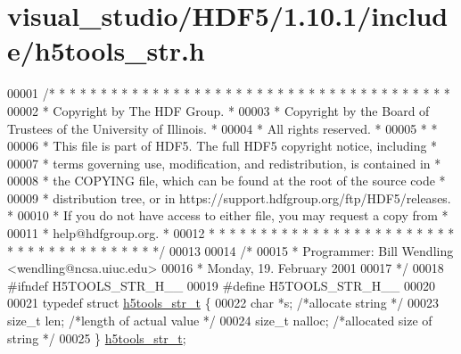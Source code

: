 \hypertarget{visual__studio_2_h_d_f5_21_810_81_2include_2h5tools__str_8h_source}{}\section{visual\+\_\+studio/\+H\+D\+F5/1.10.1/include/h5tools\+\_\+str.h}
\label{visual__studio_2_h_d_f5_21_810_81_2include_2h5tools__str_8h_source}

\begin{DoxyCode}
00001 \textcolor{comment}{/* * * * * * * * * * * * * * * * * * * * * * * * * * * * * * * * * * * * * * *}
00002 \textcolor{comment}{ * Copyright by The HDF Group.                                               *}
00003 \textcolor{comment}{ * Copyright by the Board of Trustees of the University of Illinois.         *}
00004 \textcolor{comment}{ * All rights reserved.                                                      *}
00005 \textcolor{comment}{ *                                                                           *}
00006 \textcolor{comment}{ * This file is part of HDF5.  The full HDF5 copyright notice, including     *}
00007 \textcolor{comment}{ * terms governing use, modification, and redistribution, is contained in    *}
00008 \textcolor{comment}{ * the COPYING file, which can be found at the root of the source code       *}
00009 \textcolor{comment}{ * distribution tree, or in https://support.hdfgroup.org/ftp/HDF5/releases.  *}
00010 \textcolor{comment}{ * If you do not have access to either file, you may request a copy from     *}
00011 \textcolor{comment}{ * help@hdfgroup.org.                                                        *}
00012 \textcolor{comment}{ * * * * * * * * * * * * * * * * * * * * * * * * * * * * * * * * * * * * * * */}
00013 
00014 \textcolor{comment}{/*}
00015 \textcolor{comment}{ * Programmer:  Bill Wendling <wendling@ncsa.uiuc.edu>}
00016 \textcolor{comment}{ *              Monday, 19. February 2001}
00017 \textcolor{comment}{ */}
00018 \textcolor{preprocessor}{#ifndef H5TOOLS\_STR\_H\_\_}
00019 \textcolor{preprocessor}{#define H5TOOLS\_STR\_H\_\_}
00020 
00021 \textcolor{keyword}{typedef} \textcolor{keyword}{struct }\hyperlink{structh5tools__str__t}{h5tools\_str\_t} \{
00022     \textcolor{keywordtype}{char}    *s;     \textcolor{comment}{/*allocate string       */}
00023     \textcolor{keywordtype}{size\_t}  len;        \textcolor{comment}{/*length of actual value    */}
00024     \textcolor{keywordtype}{size\_t}  nalloc;     \textcolor{comment}{/*allocated size of string  */}
00025 \} \hyperlink{structh5tools__str__t}{h5tools\_str\_t};

\end{DoxyCode}
